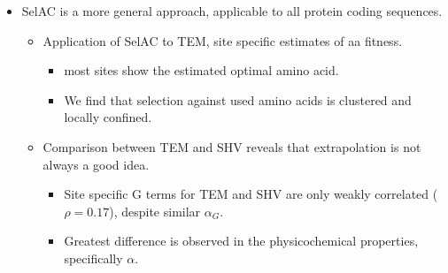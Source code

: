 \documentclass[12pt]{article}
\begin{document}
\begin{itemize}
 \item SelAC is a more general approach, applicable to all protein coding sequences.
 \begin{itemize}
  \item Application of SelAC to TEM, site specific estimates of aa fitness.
  \begin{itemize}
   \item most sites show the estimated optimal amino acid.
   \item We find that selection against used amino acids is clustered and locally confined.
  \end{itemize}
  \item Comparison between TEM and SHV reveals that extrapolation is not always a good idea.
  \begin{itemize}
   \item Site specific G terms for TEM and SHV are only weakly correlated ($\rho = 0.17$), despite similar $\alpha_G$.
   \item Greatest difference is observed in the physicochemical properties, specifically $\alpha$.
  \end{itemize}
 \end{itemize}
\end{itemize}
\end{document}
